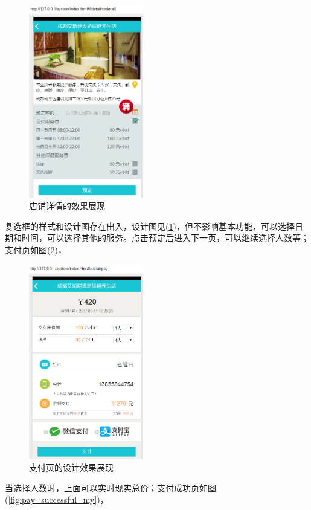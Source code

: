         \begin{figure}[htbp]
          \centering
          \includegraphics[width=5cm]{./img/strdetail_my.png}
          \caption{店铺详情的效果展现}
          \label{fig:strdetail_my}
        \end{figure}
        复选框的样式和设计图存在出入，设计图见(\ref{fig:strdetail_my})，但不影响基本功能，可以选择日期和时间，可以选择其他的服务。点击预定后进入下一页，可以继续选择人数等；支付页如图(\ref{fig:pay_my})，
        \begin{figure}[htbp]
          \centering
          \includegraphics[width=5cm]{./img/pay_my.png}
          \caption{支付页的设计效果展现}
          \label{fig:pay_my}
        \end{figure}
        当选择人数时，上面可以实时现实总价；支付成功页如图(\ref{fig:pay_successful_my})，
